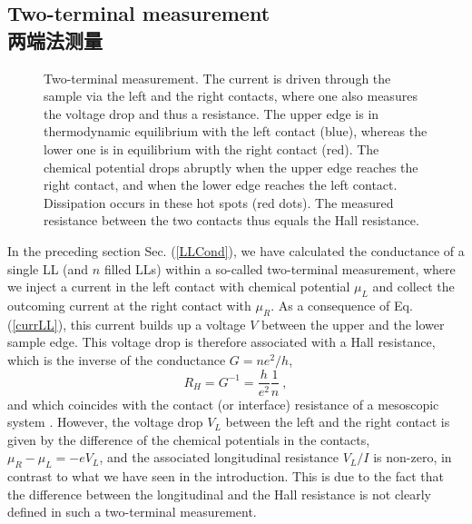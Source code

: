 \documentclass[10pt]{book}
\newcommand{\beq}{\begin{equation}}
\newcommand{\eeq}{\end{equation}}
\begin{document}


\subsection[两端法测量]{Two-terminal measurement\\\bf 两端法测量}

\begin{figure}
\begin{center}
\end{center}
\caption{ Two-terminal measurement. The current is driven through the sample via the left and the right contacts, where one
also measures the voltage drop and thus a resistance. The upper edge is in thermodynamic equilibrium with the left contact (blue), whereas
the lower one is in equilibrium with the right contact (red). The chemical potential drops abruptly
when the upper edge reaches the right contact, and when the lower edge reaches the left contact. Dissipation occurs in these hot
spots (red dots). The measured resistance between the two contacts thus equals the Hall resistance.}
\label{fig13}
\end{figure}


In the preceding section Sec. (\ref{LLCond}), we have calculated the conductance of a single LL (and $n$ filled LLs)
within a so-called two-terminal measurement, where we inject a current in the left contact with chemical potential 
$\mu_L$ and collect the outcoming current at the right contact with $\mu_R$. As a consequence of Eq. (\ref{currLL}),
this current builds up a voltage $V$ between the upper and the lower sample edge. This voltage drop
is therefore associated with a Hall resistance, which is the inverse of the conductance $G=ne^2/h$,
\beq\label{Hall2Term}
R_H = G^{-1} = \frac{h}{e^2}\frac{1}{n}\ ,
\eeq
and which coincides with the contact (or interface) resistance of a mesoscopic system \cite{datta}.
However, the voltage drop $V_L$ between the left and the right contact is given by the difference of the chemical potentials
in the contacts, $\mu_R - \mu_L = -eV_L$, and the associated longitudinal resistance $V_L/I$ is non-zero,
in contrast to what we have seen in the introduction. This is due to the fact that 
the difference between the longitudinal and the Hall resistance is not clearly defined in such a two-terminal measurement.
\end{document}
